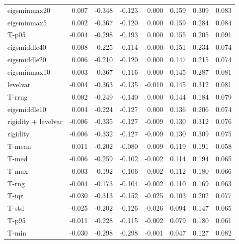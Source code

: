 \documentclass{article}  %
\begin{document}
\begin{table}[H]
\begin{tabular}{lrrrrrrr}
eigsminmax20                   &  0.007 & -0.348 & -0.123 &  0.000 &  0.159 &  0.309 &  0.083 \\
eigsminmax5                    &  0.002 & -0.367 & -0.120 &  0.000 &  0.159 &  0.284 &  0.084 \\
T-p05                          & -0.004 & -0.298 & -0.193 &  0.000 &  0.155 &  0.205 &  0.091 \\
eigsmiddle40                   &  0.008 & -0.225 & -0.114 &  0.000 &  0.151 &  0.234 &  0.074 \\
eigsmiddle20                   &  0.006 & -0.210 & -0.120 &  0.000 &  0.147 &  0.215 &  0.074 \\
eigsminmax10                   &  0.003 & -0.367 & -0.116 &  0.000 &  0.145 &  0.287 &  0.081 \\
levelvar                       & -0.004 & -0.363 & -0.135 & -0.010 &  0.145 &  0.312 &  0.081 \\
T-rrng                         &  0.002 & -0.249 & -0.140 &  0.000 &  0.144 &  0.184 &  0.079 \\
eigsmiddle10                   &  0.004 & -0.224 & -0.127 &  0.000 &  0.136 &  0.206 &  0.074 \\
rigidity + levelvar            & -0.006 & -0.335 & -0.127 & -0.009 &  0.130 &  0.312 &  0.076 \\
rigidity                       & -0.006 & -0.332 & -0.127 & -0.009 &  0.130 &  0.309 &  0.075 \\
T-mean                         &  0.011 & -0.202 & -0.080 &  0.009 &  0.119 &  0.191 &  0.058 \\
T-med                          & -0.006 & -0.259 & -0.102 & -0.002 &  0.114 &  0.194 &  0.065 \\
T-max                          & -0.003 & -0.192 & -0.106 & -0.002 &  0.112 &  0.180 &  0.066 \\
T-rng                          & -0.004 & -0.173 & -0.104 & -0.002 &  0.110 &  0.169 &  0.063 \\
T-iqr                          & -0.030 & -0.313 & -0.152 & -0.025 &  0.103 &  0.202 &  0.077 \\
T-std                          & -0.025 & -0.202 & -0.126 & -0.026 &  0.094 &  0.147 &  0.065 \\
T-p95                          & -0.011 & -0.228 & -0.115 & -0.002 &  0.079 &  0.180 &  0.061 \\
T-min                          & -0.030 & -0.298 & -0.298 & -0.001 &  0.047 &  0.127 &  0.082 \\
\hline
\end{tabular}
\end{table}




\end{document}
